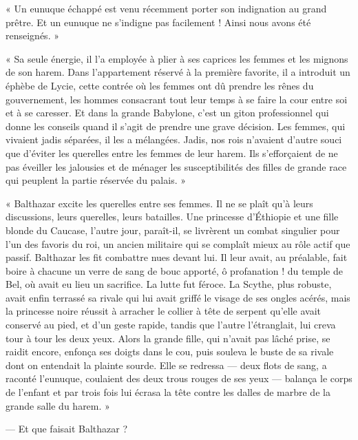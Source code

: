 \documentclass[a4paper, 11pt, oneside, polutonikogreek, french]{article}
\begin{document}
\bigskip
\centerline{\EightStarTaper}
\centerline{\EightStarTaper\EightStarTaper}
\bigskip

« Un eunuque échappé est venu récemment porter son indignation au grand prêtre. Et un eunuque ne s'indigne pas facilement ! Ainsi nous avons été renseignés. »

« Sa seule énergie, il l'a employée à plier à ses caprices les femmes et les mignons de son harem. Dans l'appartement réservé à la première favorite, il a introduit un éphèbe de Lycie, cette contrée où les femmes ont dû prendre les rênes du gouvernement, les hommes consacrant tout leur temps à se faire la cour entre soi et à se caresser. Et dans la grande Babylone, c'est un giton professionnel qui donne les conseils quand il s'agit de prendre une grave décision. Les femmes, qui vivaient jadis séparées, il les a mélangées. Jadis, nos rois n'avaient d'autre souci que d'éviter les querelles entre les femmes de leur harem. Ils s'efforçaient de ne pas éveiller les jalousies et de ménager les susceptibilités des filles de grande race qui peuplent la partie réservée du palais. »

\bigskip
\centerline{\EightStarTaper}
\centerline{\EightStarTaper\EightStarTaper}
\bigskip

« Balthazar excite les querelles entre ses femmes. Il ne se plaît qu'à leurs discussions, leurs querelles, leurs batailles. Une princesse d'Éthiopie et une fille blonde du Caucase, l'autre jour, paraît-il, se livrèrent un combat singulier pour l'un des favoris du roi, un ancien militaire qui se complaît mieux au rôle actif que passif. Balthazar les fit combattre nues devant lui. Il leur avait, au préalable, fait boire à chacune un verre de sang de bouc apporté, ô profanation ! du temple de Bel, où avait eu lieu un sacrifice. La lutte fut féroce. La Scythe, plus robuste, avait enfin terrassé sa rivale qui lui avait griffé le visage de ses ongles acérés, mais la princesse noire réussit à arracher le collier à tête de serpent qu'elle avait conservé au pied, et d'un geste rapide, tandis que l'autre l'étranglait, lui creva tour à tour les deux yeux. Alors la grande fille, qui n'avait pas lâché prise, se raidit encore, enfonça ses doigts dans le cou, puis souleva le buste de sa rivale dont on entendait la plainte sourde. Elle se redressa --- deux flots de sang, a raconté l'eunuque, coulaient des deux trous rouges de ses yeux --- balança le corps de l'enfant et par trois fois lui écrasa la tête contre les dalles de marbre de la grande salle du harem. »

--- Et que faisait Balthazar ?
\end{document}
